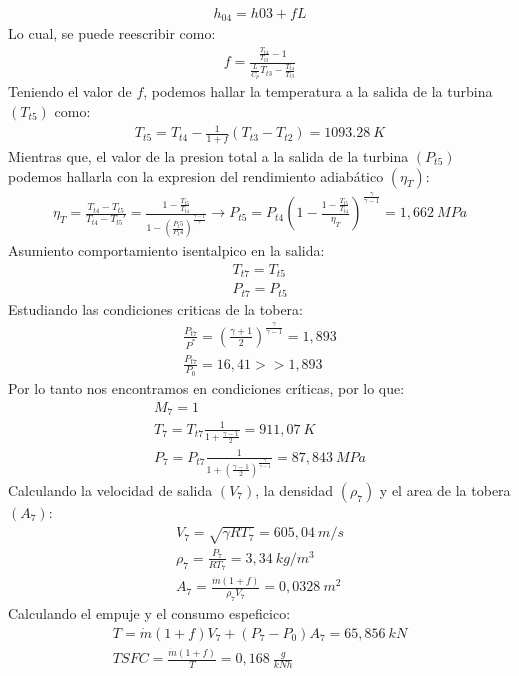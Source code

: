 \documentclass{report}
\begin{document}
\begin{gather}
  h_{04}=h{03}+fL
\end{gather}
Lo cual, se puede reescribir como:
\begin{gather}
  f=\frac{\frac{T_{t4}}{T_{t3}}-1}{\frac{L}{C_p}T_{t3}-\frac{T_{t4}}{T_{t3}}}
\end{gather}
Teniendo el valor de $f$, podemos hallar la temperatura a la salida de la turbina $(T_{t5})$ como:
\begin{gather}
  T_{t5}=T_{t4}-\frac{1}{1+f}(T_{t3}-T_{t2})=1093.28\:K
\end{gather}
Mientras que, el valor de la presion total a la salida de la turbina $(P_{t5})$ podemos hallarla con la expresion del rendimiento adiabático $(\eta_T)$:
\begin{gather}
  \eta_T = \frac{T_{t4}-T_{t5}}{T_{t4}-T_{t5}'}=\frac{1-\frac{T_{t5}}{T_{t4}}}{1-\left(\frac{P_t5}{P_t4}\right)^\frac{\gamma-1}{\gamma}}\xrightarrow{}P_{t5}=P_{t4}\left(1-\frac{1-\frac{T_{t5}}{T_{t4}}}{\eta_T}\right)^\frac{\gamma}{\gamma-1}=1,662\:MPa
\end{gather}
Asumiento comportamiento isentalpico en la salida:
\begin{gather}
  T_{t7} = T_{t5}\\
  P_{t7} = P_{t5}
\end{gather}
Estudiando las condiciones criticas de la tobera:
\begin{gather}
  \frac{P_{t7}}{P^*}=\left(\frac{\gamma+1}{2}\right)^\frac{\gamma}{\gamma-1}=1,893\\
  \frac{P_{t7}}{P_0}=16,41 >> 1,893
\end{gather}
Por lo tanto nos encontramos en condiciones críticas, por lo que:
\begin{gather}
  M_7 = 1\\
  T_7 = T_{t7} \frac{1}{1 + \frac{\gamma - 1}{2}} = 911,07\:K\\
  P_7 = P_{t7} \frac{1}{1 + \left(\frac{\gamma - 1}{2}\right)^\frac{\gamma}{\gamma-1}}=87,843\:MPa
\end{gather}
Calculando la velocidad de salida $(V_7)$, la densidad $(\rho_7)$ y el area de la tobera $(A_7)$:
\begin{gather}
  V_7 = \sqrt{\gamma R T_7}=605,04\:m/s\\
  \rho_7 = \frac{P_7}{R T_7}=3,34\:kg/m^3\\
  A_7 = \frac{\Dot{m} (1+f)}{\rho_7 V_7}=0,0328\:m^2
\end{gather}
Calculando el empuje y el consumo espeficico:
\begin{gather}
  T = \Dot{m} (1+f) V_7 + (P_7-P_0)A_7=65,856\:kN\\
  TSFC = \frac{\Dot{m} (1+f)}{T}=\boxed{0,168\:\frac{g}{kN h}}
\end{gather}
\end{document}
